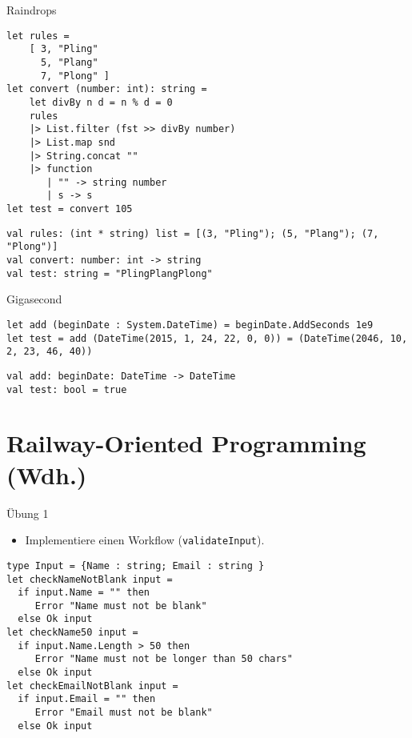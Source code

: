 \documentclass[t]{beamer}
\begin{document}
\begin{frame}[label={sec:orgd002e1b},fragile]{Raindrops}
 \begin{verbatim}
let rules =
    [ 3, "Pling"
      5, "Plang"
      7, "Plong" ]
let convert (number: int): string =
    let divBy n d = n % d = 0
    rules
    |> List.filter (fst >> divBy number)
    |> List.map snd
    |> String.concat ""
    |> function
       | "" -> string number
       | s -> s
let test = convert 105
\end{verbatim}

\begin{verbatim}
val rules: (int * string) list = [(3, "Pling"); (5, "Plang"); (7, "Plong")]
val convert: number: int -> string
val test: string = "PlingPlangPlong"
\end{verbatim}
\end{frame}

\begin{frame}[label={sec:orgfbf7f6d},fragile]{Gigasecond}
 \begin{verbatim}
let add (beginDate : System.DateTime) = beginDate.AddSeconds 1e9
let test = add (DateTime(2015, 1, 24, 22, 0, 0)) = (DateTime(2046, 10, 2, 23, 46, 40))
\end{verbatim}

\begin{verbatim}
val add: beginDate: DateTime -> DateTime
val test: bool = true
\end{verbatim}
\end{frame}


\section{Railway-Oriented Programming (Wdh.) }
\label{sec:orgdfdb107}

\begin{frame}[label={sec:org012adce},fragile]{Übung 1}
 \begin{itemize}
\item Implementiere einen Workflow (\texttt{validateInput}).
\end{itemize}

\begin{verbatim}
type Input = {Name : string; Email : string }
let checkNameNotBlank input =
  if input.Name = "" then
     Error "Name must not be blank"
  else Ok input
let checkName50 input =
  if input.Name.Length > 50 then
     Error "Name must not be longer than 50 chars"
  else Ok input
let checkEmailNotBlank input =
  if input.Email = "" then
     Error "Email must not be blank"
  else Ok input
\end{verbatim}
\end{frame}
\end{document}
